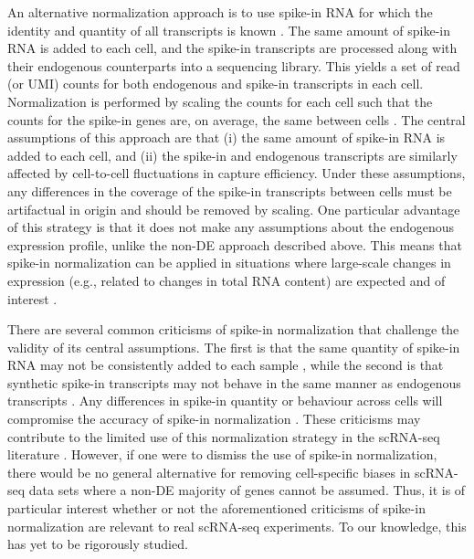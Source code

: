 \documentclass{article}
\begin{document}
An alternative normalization approach is to use spike-in RNA for which the identity and quantity of all transcripts is known \cite{stegle2015computational,bacher2016design}.
The same amount of spike-in RNA is added to each cell, and the spike-in transcripts are processed along with their endogenous counterparts into a sequencing library.
This yields a set of read (or UMI) counts for both endogenous and spike-in transcripts in each cell.
Normalization is performed by scaling the counts for each cell such that the counts for the spike-in genes are, on average, the same between cells \cite{katayama2013samstrt}.
The central assumptions of this approach are that (i) the same amount of spike-in RNA is added to each cell, and (ii) the spike-in and endogenous transcripts are similarly affected by cell-to-cell fluctuations in capture efficiency.
Under these assumptions, any differences in the coverage of the spike-in transcripts between cells must be artifactual in origin and should be removed by scaling.
One particular advantage of this strategy is that it does not make any assumptions about the endogenous expression profile, unlike the non-DE approach described above.
This means that spike-in normalization can be applied in situations where large-scale changes in expression (e.g., related to changes in total RNA content) are expected and of interest \cite{lun2016stepbystep}.

There are several common criticisms of spike-in normalization that challenge the validity of its central assumptions.
The first is that the same quantity of spike-in RNA may not be consistently added to each sample \cite{robinson2010tmm}, while the second is that synthetic spike-in transcripts may not behave in the same manner as endogenous transcripts \cite{grun2015design}.
Any differences in spike-in quantity or behaviour across cells will compromise the accuracy of spike-in normalization \cite{risso2014normalization}.
These criticisms may contribute to the limited use of this normalization strategy in the scRNA-seq literature \cite{bacher2016design}.
However, if one were to dismiss the use of spike-in normalization, there would be no general alternative for removing cell-specific biases in scRNA-seq data sets where a non-DE majority of genes cannot be assumed.
Thus, it is of particular interest whether or not the aforementioned criticisms of spike-in normalization are relevant to real scRNA-seq experiments.
To our knowledge, this has yet to be rigorously studied.
\end{document}
